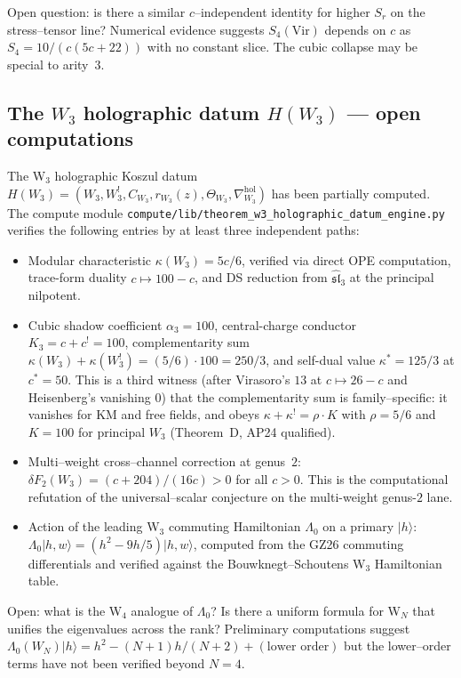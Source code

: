 \documentclass[11pt]{article}
\newcommand{\ket}[1]{\lvert #1\rangle}
\begin{document}
Open question: is there a similar $c$--independent identity for higher $S_r$
on the stress--tensor line?  Numerical evidence suggests $S_4(\mathrm{Vir})$
depends on $c$ as $S_4 = 10/(c(5c+22))$ with no constant slice.  The cubic
collapse may be special to arity~$3$.

\subsection{The $W_3$ holographic datum $H(W_3)$ --- open computations}

The W$_3$ holographic Koszul datum
$H(W_3) = (W_3, W_3^!, C_{W_3}, r_{W_3}(z), \Theta_{W_3}, \nabla^{\mathrm{hol}}_{W_3})$
has been partially computed.  The compute module
\texttt{compute/lib/theorem\_w3\_holographic\_datum\_engine.py} verifies the
following entries by at least three independent paths:
\begin{itemize}
\item Modular characteristic $\kappa(W_3) = 5c/6$, verified via direct OPE
  computation, trace-form duality $c \mapsto 100 - c$, and DS reduction
  from $\widehat{\mathfrak{sl}}_3$ at the principal nilpotent.
\item Cubic shadow coefficient $\alpha_3 = 100$, central-charge
  conductor $K_3=c+c^!=100$, complementarity sum
  $\kappa(W_3) + \kappa(W_3^!) = (5/6)\cdot 100 = 250/3$, and
  self-dual value $\kappa^*=125/3$ at $c^*=50$.  This is a third witness
  (after Virasoro's $13$ at $c \mapsto 26-c$ and Heisenberg's
  vanishing $0$) that the complementarity sum is family--specific: it
  vanishes for KM and free fields, and obeys $\kappa + \kappa^! =
  \rho \cdot K$ with $\rho = 5/6$ and $K = 100$ for principal $W_3$
  (Theorem~D, AP24 qualified).
\item Multi--weight cross--channel correction at genus~$2$:
  $\delta F_2(W_3) = (c+204)/(16c) > 0$ for all $c > 0$.  This is the
  computational refutation of the universal--scalar conjecture
  on the multi-weight genus-$2$ lane.
\item Action of the leading W$_3$ commuting Hamiltonian
  $\Lambda_0$ on a primary $\ket{h}$:
  $\Lambda_0 \ket{h,w} = (h^2 - 9h/5)\ket{h,w}$, computed from the GZ26
  commuting differentials and verified against the Bouwknegt--Schoutens
  W$_3$ Hamiltonian table.
\end{itemize}
Open: what is the W$_4$ analogue of $\Lambda_0$?  Is there a uniform formula
for W$_N$ that unifies the eigenvalues across the rank?  Preliminary
computations suggest $\Lambda_0(W_N)\ket{h} = h^2 - (N{+}1)h/(N{+}2) + (\text{lower order})$
but the lower--order terms have not been verified beyond $N=4$.
\end{document}
